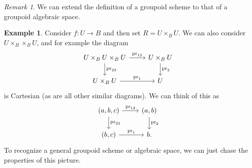 \documentclass{amsart}
\theoremstyle{definition}
\newtheorem{exm}[thm]{Example}
\theoremstyle{remark}
\newtheorem{rmk}[thm]{Remark}
\theoremstyle{plain}
\theoremstyle{definition}
\theoremstyle{remark}
\newcommand{\on}[1]{\operatorname{#1}}
\newcommand{\1}{\mathbf{1}}
\newcommand{\2}{\mathbf{2}}
\newcommand{\3}{\mathbf{3}}
\begin{document}
\begin{rmk}
    We can extend the definition of a groupoid scheme to that of a groupoid algebraic space.
\end{rmk}

\begin{exm}
    Consider \(f \colon U \to B\) and then set \(R = U \times_B U\). We can also consider \(U \times_B \times_B U\), and for example the diagram
    \begin{equation*}
    \begin{tikzcd}
        U \times_B U \times_B U \ar{r}{\on{pr}_{12}} \ar{d}{\on{pr}_{23}} & U \times_B U \ar{d}{\on{pr}_2} \\
        U \times_B U \ar{r}{\on{pr}_1} & U
    \end{tikzcd}
    \end{equation*}
    is Cartesian (as are all other similar diagrams). We can think of this as
    \begin{equation*}
    \begin{tikzcd}
        (a,b,c) \ar{r}{\on{pr}_{12}} \ar{d}{\on{pr}_{23}} & (a,b) \ar{d}{\on{pr}_2} \\
        (b,c) \ar{r}{\on{pr}_1} & b.
    \end{tikzcd}
    \end{equation*}
    To recognize a general groupoid scheme or algebraic space, we can just chase the properties of this picture.
\end{exm}
\end{document}
